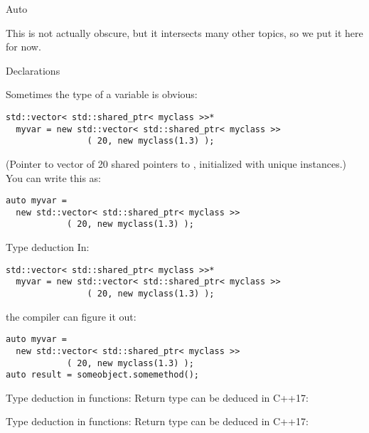 
 {Auto}

This is not actually obscure, but it intersects many other topics, so
we put it here for now.

 {Declarations}

Sometimes the type of a variable is obvious:
\begin{lstlisting}
std::vector< std::shared_ptr< myclass >>*
  myvar = new std::vector< std::shared_ptr< myclass >>
                ( 20, new myclass(1.3) );
\end{lstlisting}
(Pointer to vector of 20 shared pointers to , initialized
with unique instances.)  You can write this as:
\begin{lstlisting}
auto myvar =
  new std::vector< std::shared_ptr< myclass >>
            ( 20, new myclass(1.3) );
\end{lstlisting}

\begin{slide}{Type deduction}
  \label{sl:auto-deduct}
In:
\begin{lstlisting}
std::vector< std::shared_ptr< myclass >>*
  myvar = new std::vector< std::shared_ptr< myclass >>
                ( 20, new myclass(1.3) );
\end{lstlisting}
the compiler can figure it out:
\begin{lstlisting}
auto myvar =
  new std::vector< std::shared_ptr< myclass >>
            ( 20, new myclass(1.3) );
auto result = someobject.somemethod();
\end{lstlisting}
\end{slide}

\begin{block}{Type deduction in functions}:
  \label{sl:auto-fun}
  Return type can be deduced in C++17:
\end{block}

\begin{block}{Type deduction in functions}:
  \label{sl:auto-method}
  Return type can be deduced in C++17:
\end{block}

